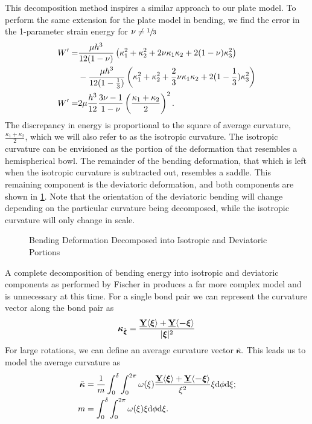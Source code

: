 This decomposition method inspires a similar approach to our plate model. To perform the same extension for the plate model in bending, we find the error in the 1-parameter strain energy for \(\nu \neq \sfrac{1}{3}\)
%
\begin{align}
    W'=&\frac{\mu h^3}{12(1-\nu)} \left(\kappa_1^2+\kappa_2^2+2\nu\kappa_1\kappa_2+2(1-\nu)\kappa_3^2 \right)\notag\\
    &-\frac{\mu h^3}{12(1-\frac{1}{3})} \left(\kappa_1^2+\kappa_2^2+\frac{2}{3}\nu\kappa_1\kappa_2+2(1-\frac{1}{3})\kappa_3^2 \right) \notag \\
    W'=&2\mu \frac{h^3}{12}\frac{3\nu-1}{1-\nu} \left(\frac{\kappa_1+\kappa_2}{2}\right)^2.\notag
\end{align}
%
The discrepancy in energy is proportional to the square of average curvature, \(\frac{\kappa_1+\kappa_2}{2}\), which we will also refer to as the isotropic curvature.  The isotropic curvature can be envisioned as the portion of the deformation that resembles a hemispherical bowl.  The remainder of the bending deformation, that which is left when the isotropic curvature is subtracted out, resembles a saddle. This remaining component is the deviatoric deformation, and both components are shown in \cref{fig:BendingDecomp}. Note that the orientation of the deviatoric bending will change depending on the particular curvature being decomposed, while the isotropic curvature will only change in scale.
%
\begin{figure}[htbp]
  \vspace{5mm}
  \centering
  \resizebox{\linewidth}{!}{}
  \caption{Bending Deformation Decomposed into Isotropic and Deviatoric Portions}
  \label{fig:BendingDecomp}
\end{figure}
%
A complete decomposition of bending energy into isotropic and deviatoric components as performed by Fischer in \cite{fischer1992bending} produces a far more complex model and is unnecessary at this time.  For a single bond pair we can represent the curvature vector along the bond pair as 
%
\begin{equation}
    \boldsymbol{\kappa} _{\hat{\boldsymbol{\xi}}} = \frac{\vstate{Y}{}{\boldsymbol{\xi}}+\vstate{Y}{}{\boldsymbol{-\xi}}}{|\boldsymbol{\xi}|^2}\notag
\end{equation}
%
For large rotations, we can define an average curvature vector \(\bar{\boldsymbol{\kappa}}\).
This leads us to model the average curvature as 
%
\begin{align}
    \bar{\boldsymbol{\kappa}} &= \frac{1}{m} \int_0^\delta \int_0^{2\pi}\omega(\xi)\frac{\vstate{Y}{}{\boldsymbol{\xi}}+\vstate{Y}{}{\boldsymbol{-\xi}}}{\xi^2} \xi {\rm d}\phi {\rm d}\xi ;\notag \\
    m &= \int_0^\delta \int_0^{2\pi}\omega(\xi)\xi {\rm d}\phi {\rm d}\xi. \notag
\end{align}
